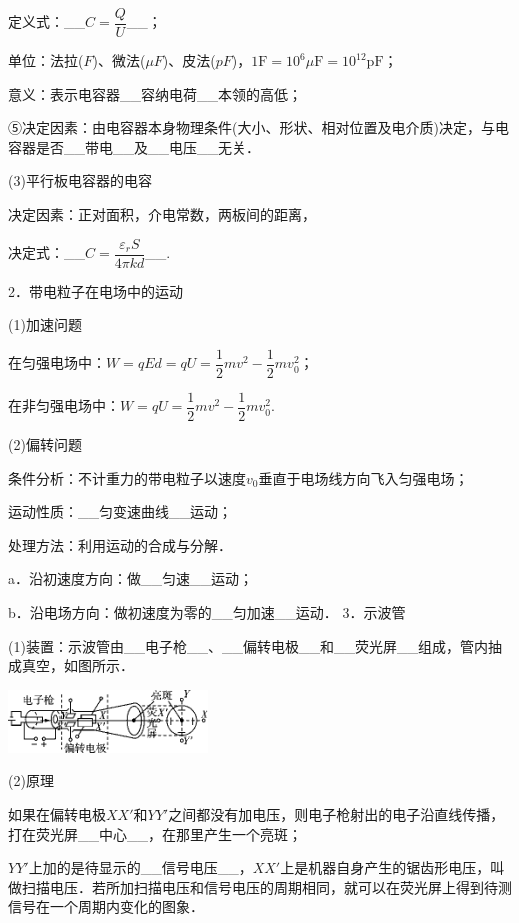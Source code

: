 \documentclass[cn,10.5pt,chinese,mac,chinesefont=founder]{elegantbook}
\begin{document}
定义式：\_\_$C=\dfrac{Q}{U}$\_\_；

单位：法拉($F$)、微法($\mu F$)、皮法($pF$)，$1 \mathrm{F}=10^{6} \mu \mathrm{F}=10^{12} \mathrm{pF}$；

意义：表示电容器\_\_容纳电荷\_\_本领的高低；

⑤决定因素：由电容器本身物理条件(大小、形状、相对位置及电介质)决定，与电容器是否\_\_带电\_\_及\_\_电压\_\_无关．

(3)平行板电容器的电容

决定因素：正对面积，介电常数，两板间的距离，

决定式：\_\_$C=\dfrac{\varepsilon_{r} S}{4 \pi k d}$\_\_.

2．带电粒子在电场中的运动

(1)加速问题

在匀强电场中：$W=q E d=q U=\dfrac{1}{2} m v^{2}-\dfrac{1}{2} m v_{0}^2$；

在非匀强电场中：$W=q U=\dfrac{1}{2} m v^{2}-\dfrac{1}{2} m v_{0}^2$.

(2)偏转问题

条件分析：不计重力的带电粒子以速度$v_0$垂直于电场线方向飞入匀强电场；

运动性质：\_\_匀变速曲线\_\_运动；

处理方法：利用运动的合成与分解．

a．沿初速度方向：做\_\_匀速\_\_运动；

b．沿电场方向：做初速度为零的\_\_匀加速\_\_运动．
3．示波管

(1)装置：示波管由\_\_电子枪\_\_、\_\_偏转电极\_\_和\_\_荧光屏\_\_组成，管内抽成真空，如图所示．

\begin{center}\includegraphics[width=2.08333in,height=0.65625in]{media/image292.png}\end{center}

(2)原理

如果在偏转电极$XX'$和$YY'$之间都没有加电压，则电子枪射出的电子沿直线传播，打在荧光屏\_\_中心\_\_，在那里产生一个亮斑；

$YY'$上加的是待显示的\_\_信号电压\_\_，$XX'$上是机器自身产生的锯齿形电压，叫做扫描电压．若所加扫描电压和信号电压的周期相同，就可以在荧光屏上得到待测信号在一个周期内变化的图象．
\end{document}
